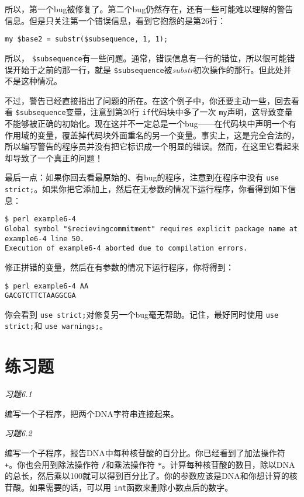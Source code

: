 所以，第一个bug被修复了。第二个bug仍然存在，还有一些可能难以理解的警告信息。但是只关注第一个错误信息，看到它抱怨的是第26行：

\begin{lstlisting}
my $base2 = substr($subsequence, 1, 1);
\end{lstlisting}

所以， \verb|$subsequence|有一些问题。通常，错误信息有一行的错位，所以很可能错误开始于之前的那一行，就是 \verb|$subsequence|被\textit{substr}初次操作的那行。但此处并不是这种情况。

不过，警告已经直接指出了问题的所在。在这个例子中，你还要主动一些，回去看看 \verb|$subsequence|变量，注意到第20行 \verb|if|代码块中多了一次 \verb|my|声明，这导致变量不能够被正确的初始化。现在这并不一定总是一个bug——在代码块中声明一个有作用域的变量，覆盖掉代码块外面重名的另一个变量。事实上，这是完全合法的，所以编写警告的程序员并没有把它标识成一个明显的错误。然而，在这里它看起来却导致了一个真正的问题！

最后一点：如果你回去看最原始的、有bug的程序，注意到在程序中没有 \verb|use strict;|。如果你把它添加上，然后在无参数的情况下运行程序，你看得到如下信息：

\begin{lstlisting}
$ perl example6-4   
Global symbol "$recievingcommitment" requires explicit package name at example6-4 line 50.
Execution of example6-4 aborted due to compilation errors.
\end{lstlisting}

修正拼错的变量，然后在有参数的情况下运行程序，你将得到：

\begin{lstlisting}
$ perl example6-4 AA
GACGTCTTCTAAGGCGA
\end{lstlisting}

你会看到 \verb|use strict;|对修复另一个bug毫无帮助。记住，最好同时使用 \verb|use strict;|和 \verb|use warnings;|。

\section{练习题}
\textcolor{black}{\textit{习题6.1}}
\begin{adjustwidth}{4em}{}
编写一个子程序，把两个DNA字符串连接起来。
\end{adjustwidth}

\textcolor{black}{\textit{习题6.2}}
\begin{adjustwidth}{4em}{}
编写一个子程序，报告DNA中每种核苷酸的百分比。你已经看到了加法操作符 \verb|+|。你也会用到除法操作符 \verb|/|和乘法操作符 \verb|*|。计算每种核苷酸的数目，除以DNA的总长，然后乘以100就可以得到百分比了。你的参数应该是DNA和你想计算的核苷酸。如果需要的话，可以用 \verb|int|函数来删除小数点后的数字。
\end{adjustwidth}

